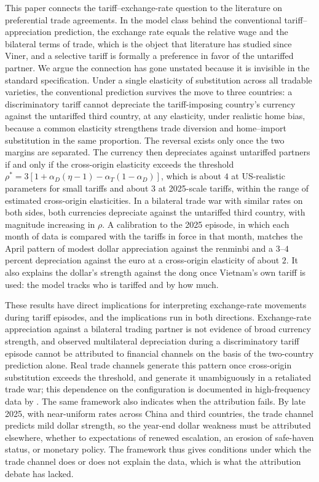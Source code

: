 \documentclass[11pt]{article}
\theoremstyle{plain}
\theoremstyle{remark}
\numberwithin{lemma}{section}
\numberwithin{proposition}{section}
\numberwithin{corollary}{section}
\newenvironment{revblock}{\par\begingroup\color{RevBlue}}{\endgroup\par}
\begin{document}
\begin{revblock}
This paper connects the tariff--exchange-rate question to the literature on preferential trade agreements. In the model class behind the conventional tariff--appreciation prediction, the exchange rate equals the relative wage and the bilateral terms of trade, which is the object that literature has studied since Viner, and a selective tariff is formally a preference in favor of the untariffed partner. We argue the connection has gone unstated because it is invisible in the standard specification. Under a single elasticity of substitution across all tradable varieties, the conventional prediction survives the move to three countries: a discriminatory tariff cannot depreciate the tariff-imposing country's currency against the untariffed third country, at any elasticity, under realistic home bias, because a common elasticity strengthens trade diversion and home--import substitution in the same proportion. The reversal exists only once the two margins are separated. The currency then depreciates against untariffed partners if and only if the cross-origin elasticity exceeds the threshold $\rho^* = 3[1 + \alpha_D(\eta-1) - \alpha_T(1-\alpha_D)]$, which is about $4$ at US-realistic parameters for small tariffs and about $3$ at 2025-scale tariffs, within the range of estimated cross-origin elasticities. In a bilateral trade war with similar rates on both sides, both currencies depreciate against the untariffed third country, with magnitude increasing in $\rho$. A calibration to the 2025 episode, in which each month of data is compared with the tariffs in force in that month, matches the April pattern of modest dollar appreciation against the renminbi and a $3$--$4$ percent depreciation against the euro at a cross-origin elasticity of about $2$. It also explains the dollar's strength against the dong once Vietnam's own tariff is used: the model tracks who is tariffed and by how much.

These results have direct implications for interpreting exchange-rate movements during tariff episodes, and the implications run in both directions. Exchange-rate appreciation against a bilateral trading partner is not evidence of broad currency strength, and observed multilateral depreciation during a discriminatory tariff episode cannot be attributed to financial channels on the basis of the two-country prediction alone. Real trade channels generate this pattern once cross-origin substitution exceeds the threshold, and generate it unambiguously in a retaliated trade war; this dependence on the configuration is documented in high-frequency data by \cite{corsetti2025}. The same framework also indicates when the attribution fails. By late 2025, with near-uniform rates across China and third countries, the trade channel predicts mild dollar strength, so the year-end dollar weakness must be attributed elsewhere, whether to expectations of renewed escalation, an erosion of safe-haven status, or monetary policy. The framework thus gives conditions under which the trade channel does or does not explain the data, which is what the attribution debate has lacked.
\end{revblock}
\end{document}
